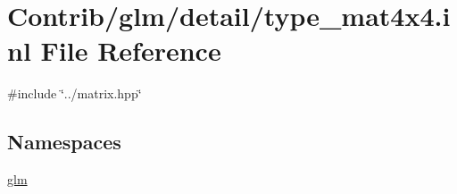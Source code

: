 \hypertarget{type__mat4x4_8inl}{}\section{Contrib/glm/detail/type\+\_\+mat4x4.inl File Reference}
\label{type__mat4x4_8inl}
{\ttfamily \#include \char`\"{}../matrix.\+hpp\char`\"{}}\newline
\subsection*{Namespaces}
\begin{DoxyCompactItemize}
\item 
 \mbox{\hyperlink{namespaceglm}{glm}}
\end{DoxyCompactItemize}
